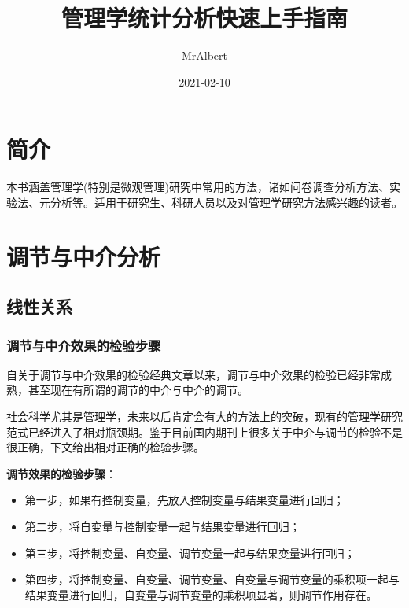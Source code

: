 \documentclass[
]{book}
\title{管理学统计分析快速上手指南}
\author{MrAlbert}
\date{2021-02-10}
\providecommand{\tightlist}{%
  \setlength{\itemsep}{0pt}\setlength{\parskip}{0pt}}
\begin{document}
\maketitle

{
\setcounter{tocdepth}{1}
\tableofcontents
}
\hypertarget{ux7b80ux4ecb}{%
\chapter*{简介}\label{ux7b80ux4ecb}}

本书涵盖管理学(特别是微观管理)研究中常用的方法，诸如问卷调查分析方法、实验法、元分析等。适用于研究生、科研人员以及对管理学研究方法感兴趣的读者。

\hypertarget{mome}{%
\chapter{调节与中介分析}\label{mome}}

\hypertarget{linear}{%
\section{线性关系}\label{linear}}

\hypertarget{momesteps}{%
\subsection{调节与中介效果的检验步骤}\label{momesteps}}

自\autocite{Baron1986:RNG}关于调节与中介效果的检验经典文章以来，调节与中介效果的检验已经非常成熟，甚至现在有所谓的调节的中介与中介的调节。

社会科学尤其是管理学，未来以后肯定会有大的方法上的突破，现有的管理学研究范式已经进入了相对瓶颈期。鉴于目前国内期刊上很多关于中介与调节的检验不是很正确，下文给出相对正确的检验步骤。

\textbf{调节效果的检验步骤}：

\begin{itemize}
\tightlist
\item
  第一步，如果有控制变量，先放入控制变量与结果变量进行回归；
\item
  第二步，将自变量与控制变量一起与结果变量进行回归；
\item
  第三步，将控制变量、自变量、调节变量一起与结果变量进行回归；
\item
  第四步，将控制变量、自变量、调节变量、自变量与调节变量的乘积项一起与结果变量进行回归，自变量与调节变量的乘积项显著，则调节作用存在。
\end{itemize}
\end{document}
